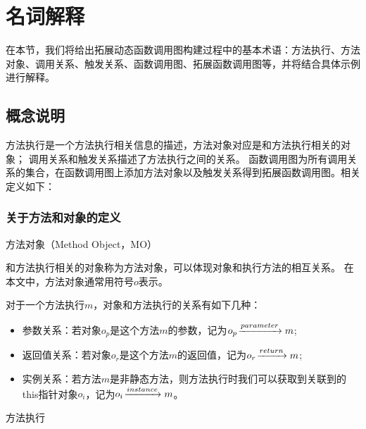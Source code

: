 \chapter{名词解释}
\label{chp:definition}


在本节，我们将给出拓展动态函数调用图构建过程中的基本术语：方法执行、方法对象、调用关系、触发关系、函数调用图、拓展函数调用图等，并将结合具体示例进行解释。

\section{概念说明}
方法执行是一个方法执行相关信息的描述，方法对象对应是和方法执行相关的对象；
调用关系和触发关系描述了方法执行之间的关系。
函数调用图为所有调用关系的集合，在函数调用图上添加方法对象以及触发关系得到拓展函数调用图。相关定义如下：

\subsection{关于方法和对象的定义}

\begin{Def}
	方法对象（Method Object，MO）
\end{Def}

和方法执行相关的对象称为方法对象，可以体现对象和执行方法的相互关系。
在本文中，方法对象通常用符号$o$表示。
	

	对于一个方法执行$m$，对象和方法执行的关系有如下几种：
	\begin{itemize}
				\setlength{\itemsep}{1pt}
				\setlength{\parskip}{0pt}
				\setlength{\parsep}{0pt}
		\item 参数关系：若对象$o_p$是这个方法$m$的参数，记为$o_p \joinrel\xrightarrow{parameter} m$;%
		\item 返回值关系：若对象$o_r$是这个方法$m$的返回值，记为$o_r \joinrel\xrightarrow{return} m$;%
		\item 实例关系：若方法$m$是非静态方法，则方法执行时我们可以获取到关联到的this指针对象$o_i$，记为$o_i \joinrel\xrightarrow{instance} m$。%
	\end{itemize}




\begin{Def}方法执行\end{Def}

